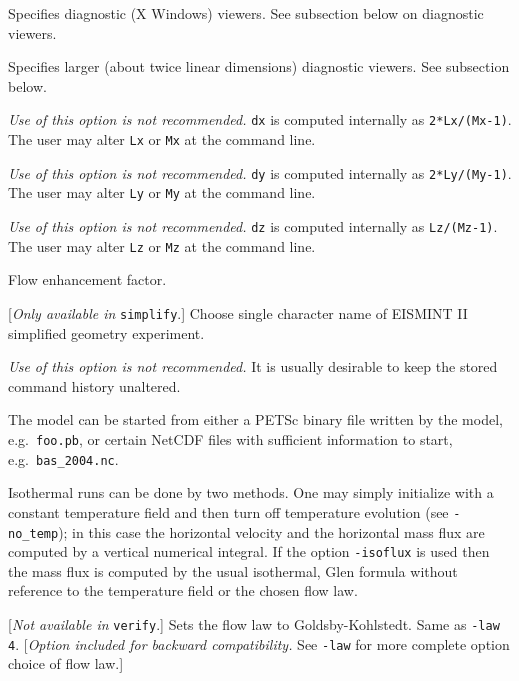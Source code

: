 \documentclass[11pt,final]{amsart}
\begin{document}
  Specifies diagnostic (X Windows) viewers.  See subsection below on diagnostic viewers.

  Specifies larger (about twice linear dimensions) diagnostic viewers.  See subsection below.

  \emph{Use of this option is not recommended.}  \verb|dx| is computed internally as \verb|2*Lx/(Mx-1)|.  The user may alter \verb|Lx| or \verb|Mx| at the command line.

  \emph{Use of this option is not recommended.}  \verb|dy| is computed internally as \verb|2*Ly/(My-1)|.  The user may alter \verb|Ly| or \verb|My| at the command line.

  \emph{Use of this option is not recommended.}  \verb|dz| is computed internally as \verb|Lz/(Mz-1)|.  The user may alter \verb|Lz| or \verb|Mz| at the command line.

  Flow enhancement factor.

  [\emph{Only available in } \verb|simplify|.]  Choose single character name of EISMINT II \cite{EISMINT00} simplified geometry experiment.

  \emph{Use of this option is not recommended.}  It is usually desirable to keep the stored command history unaltered.


  The model can be started from either a PETSc binary file written by the model, e.g.~\verb|foo.pb|, or certain NetCDF files with sufficient information to start, e.g.~\verb|bas_2004.nc|.

  Isothermal runs can be done by two methods.  One may simply initialize with a constant temperature field and then turn off temperature evolution (see \verb|-no_temp|); in this case the horizontal velocity and the horizontal mass flux are computed by a vertical numerical integral.  If the option \verb|-isoflux| is used then the mass flux is computed by the usual isothermal, Glen formula without reference to the temperature field or the chosen flow law.

  [\emph{Not available in } \verb|verify|.]  Sets the flow law to Goldsby-Kohlstedt.  Same as \verb|-law 4|.  [\emph{Option included for backward compatibility.}  See \verb|-law| for more complete option choice of flow law.]


\end{document}
